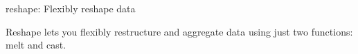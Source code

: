 reshape: Flexibly reshape data

Reshape lets you flexibly restructure and aggregate data using just two functions: melt and cast.

